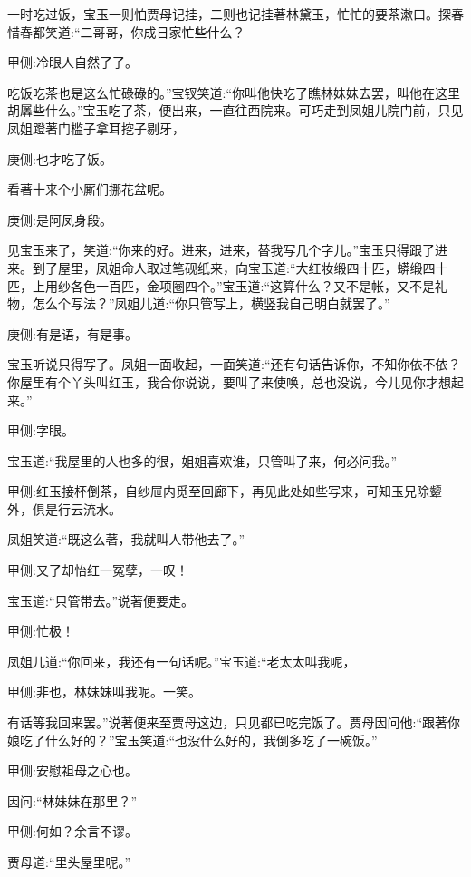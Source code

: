 \begin{parag}
    一时吃过饭，宝玉一则怕贾母记挂，二则也记挂著林黛玉，忙忙的要茶漱口。探春惜春都笑道:“二哥哥，你成日家忙些什么？\begin{note}甲侧:冷眼人自然了了。\end{note}吃饭吃茶也是这么忙碌碌的。”宝钗笑道:“你叫他快吃了瞧林妹妹去罢，叫他在这里胡羼些什么。”宝玉吃了茶，便出来，一直往西院来。可巧走到凤姐儿院门前，只见凤姐蹬著门槛子拿耳挖子剔牙，\begin{note}庚侧:也才吃了饭。\end{note}看著十来个小厮们挪花盆呢。\begin{note}庚侧:是阿凤身段。\end{note}见宝玉来了，笑道:“你来的好。进来，进来，替我写几个字儿。”宝玉只得跟了进来。到了屋里，凤姐命人取过笔砚纸来，向宝玉道:“大红妆缎四十匹，蟒缎四十匹，上用纱各色一百匹，金项圈四个。”宝玉道:“这算什么？又不是帐，又不是礼物，怎么个写法？”凤姐儿道:“你只管写上，横竖我自己明白就罢了。”\begin{note}庚侧:有是语，有是事。\end{note}宝玉听说只得写了。凤姐一面收起，一面笑道:“还有句话告诉你，不知你依不依？你屋里有个丫头叫红玉，我合你说说，要叫了来使唤，总也没说，今儿见你才想起来。”\begin{note}甲侧:字眼。\end{note}宝玉道:“我屋里的人也多的很，姐姐喜欢谁，只管叫了来，何必问我。”\begin{note}甲侧:红玉接杯倒茶，自纱屉内觅至回廊下，再见此处如些写来，可知玉兄除颦外，俱是行云流水。\end{note}凤姐笑道:“既这么著，我就叫人带他去了。”\begin{note}甲侧:又了却怡红一冤孽，一叹！\end{note}宝玉道:“只管带去。”说著便要走。\begin{note}甲侧:忙极！\end{note}凤姐儿道:“你回来，我还有一句话呢。”宝玉道:“老太太叫我呢，\begin{note}甲侧:非也，林妹妹叫我呢。一笑。\end{note}有话等我回来罢。”说著便来至贾母这边，只见都已吃完饭了。贾母因问他:“跟著你娘吃了什么好的？”宝玉笑道:“也没什么好的，我倒多吃了一碗饭。”\begin{note}甲侧:安慰祖母之心也。\end{note}因问:“林妹妹在那里？”\begin{note}甲侧:何如？余言不谬。\end{note}贾母道:“里头屋里呢。”
\end{parag}


